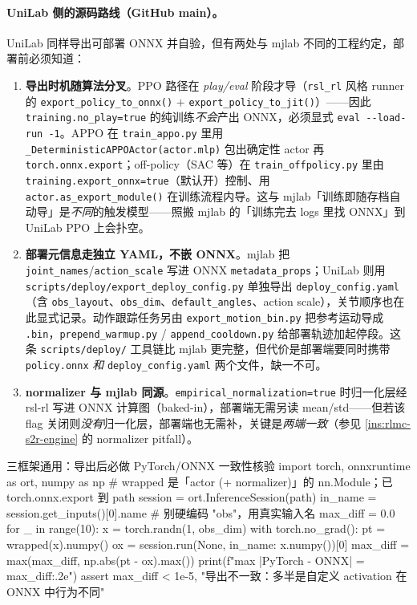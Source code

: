 \paragraph{UniLab 侧的源码路线（GitHub main）。}UniLab 同样导出可部署 ONNX 并自验，但有两处与 mjlab 不同的工程约定，部署前必须知道：
\begin{enumerate}
  \item \textbf{导出时机随算法分叉}。PPO 路径在 \emph{play/eval} 阶段才导（\texttt{rsl\_rl} 风格 runner 的 \texttt{export\_policy\_to\_onnx()} $+$ \texttt{export\_policy\_to\_jit()}）——因此 \verb|training.no_play=true| 的纯训练\emph{不会}产出 ONNX，必须显式 \verb|eval --load-run -1|。APPO 在 \texttt{train\_appo.py} 里用 \texttt{\_DeterministicAPPOActor(actor.mlp)} 包出确定性 actor 再 \verb|torch.onnx.export|；off-policy（SAC 等）在 \texttt{train\_offpolicy.py} 里由 \verb|training.export_onnx=true|（默认开）控制、用 \texttt{actor.as\_export\_module()} 在训练流程内导。这与 mjlab「训练即随存档自动导」是\emph{不同}的触发模型——照搬 mjlab 的「训练完去 logs 里找 ONNX」到 UniLab PPO 上会扑空。
  \item \textbf{部署元信息走独立 YAML，不嵌 ONNX}。mjlab 把 \verb|joint_names|/\verb|action_scale| 写进 ONNX \verb|metadata_props|；UniLab 则用 \texttt{scripts/deploy/export\_deploy\_config.py} 单独导出 \texttt{deploy\_config.yaml}（含 \verb|obs_layout|、\verb|obs_dim|、\verb|default_angles|、action scale），关节顺序也在此显式记录。动作跟踪任务另由 \texttt{export\_motion\_bin.py} 把参考运动导成 \texttt{.bin}，\texttt{prepend\_warmup.py} / \texttt{append\_cooldown.py} 给部署轨迹加起停段。这条 \texttt{scripts/deploy/} 工具链比 mjlab 更完整，但代价是部署端要同时携带 \verb|policy.onnx| \emph{和} \verb|deploy_config.yaml| 两个文件，缺一不可。
  \item \textbf{normalizer 与 mjlab 同源}。\verb|empirical_normalization=true| 时归一化层经 rsl-rl 写进 ONNX 计算图（baked-in），部署端无需另读 mean/std——但若该 flag 关闭则\emph{没有}归一化层，部署端也无需补，关键是\emph{两端一致}（参见 \cref{ins:rlmc-s2r-engine} 的 normalizer pitfall）。
\end{enumerate}

\begin{codebox}[Python]{三框架通用：导出后必做 PyTorch/ONNX 一致性核验}
import torch, onnxruntime as ort, numpy as np
# wrapped 是「actor (+ normalizer)」的 nn.Module；已 torch.onnx.export 到 path
session = ort.InferenceSession(path)
in_name = session.get_inputs()[0].name        # 别硬编码 "obs"，用真实输入名
max_diff = 0.0
for _ in range(10):
    x = torch.randn(1, obs_dim)
    with torch.no_grad():
        pt = wrapped(x).numpy()
    ox = session.run(None, {in_name: x.numpy()})[0]
    max_diff = max(max_diff, np.abs(pt - ox).max())
print(f"max |PyTorch - ONNX| = {max_diff:.2e}")
assert max_diff < 1e-5, "导出不一致：多半是自定义 activation 在 ONNX 中行为不同"
\end{codebox}

